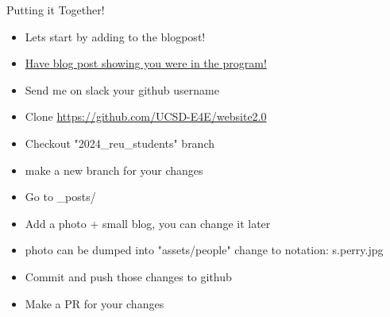 \documentclass[aspectratio=169]{beamer}
\begin{document}
\begin{frame}{Putting it Together!}
    \begin{itemize}
        \item Lets start by adding to the blogpost!
        \item \href{https://e4e.ucsd.edu/news-and-updates/2023-summer-research-students}{Have blog post showing you were in the program!} 
        \item Send me on slack your github username
        \item Clone \href{https://github.com/UCSD-E4E/website2.0}{https://github.com/UCSD-E4E/website2.0}
        \item Checkout "2024\_reu\_students" branch
        \item make a new branch for your changes
        \item Go to \_posts/
        \item Add a photo + small blog, you can change it later
        \item photo can be dumped into "assets/people" change to notation: s.perry.jpg
        \item Commit and push those changes to github
        \item Make a PR for your changes
    \end{itemize}
\end{frame}
\end{document}
